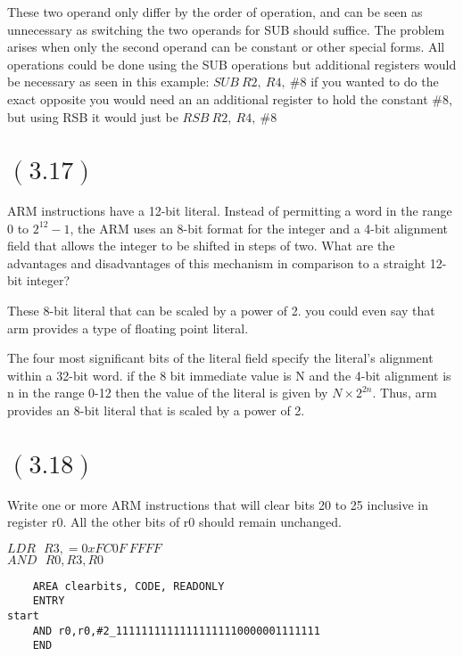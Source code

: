 \documentclass[letterpaper,12pt,titlepage]{article}
\begin{document}
\begin{mdframed}[style=MyFrame]
These two operand only differ by the order of operation, and can be seen as unnecessary as switching the two operands for SUB should suffice. The problem arises when only the second operand can be constant or other special forms. All operations could be done using the SUB operations but additional registers would be necessary as seen  in this example: $SUB~R2,~R4,~\#8$ if you wanted to do the exact opposite you would need an an additional register to hold the constant $\#8$, but using RSB it would just be $RSB~R2,~R4,~\#8$
\end{mdframed}

\newpage
\section*{$(3.17)$} ARM instructions have a 12-bit literal. Instead of permitting a word in the range 0 to $2^12 - 1$, the ARM uses an 8-bit format for the integer and a 4-bit alignment field that allows the integer to be shifted in steps of two. What are the advantages and disadvantages of this mechanism in comparison to a straight 12-bit integer? \newline

\begin{mdframed}[style=MyFrame]
These 8-bit literal that can be scaled by a power of 2. you could even say that arm provides a type of floating point literal. 

The four most significant bits of the literal field specify the literal's alignment within a 32-bit word. if the 8 bit immediate value is N and the 4-bit alignment is n in the range 0-12 then the value of the literal is given by $N\times2^{2n}$. Thus, arm provides an 8-bit literal that is scaled by a power of 2. 
\end{mdframed}


\section*{$(3.18)$} Write one or more ARM instructions that will clear bits 20 to 25 inclusive in register r0. All the other bits of r0 should remain unchanged.
\begin{mdframed}[style=MyFrame]
$LDR~~~ R3, = 0xFC0F~FFFF $\\
$AND~~~ R0,R3,R0$
\end{mdframed}

\begin{lstlisting}
    AREA clearbits, CODE, READONLY 
    ENTRY
start
    AND r0,r0,#2_11111111111111111110000001111111
    END
\end{lstlisting}
\end{document}
